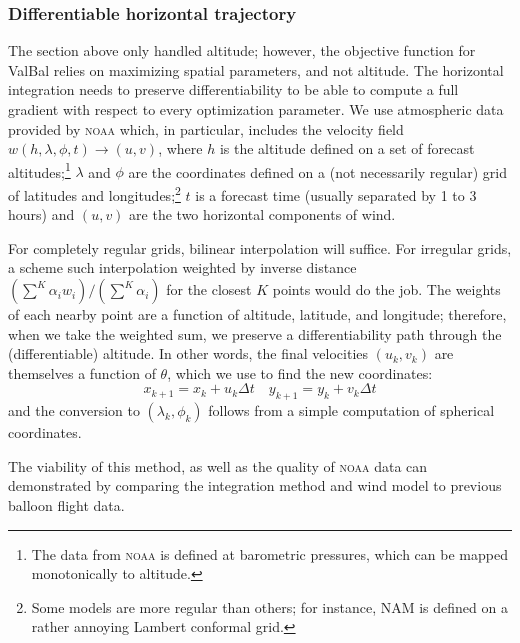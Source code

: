 \documentclass[11pt]{scrartcl} %
\begin{document}
\subsubsection{Differentiable horizontal trajectory} \label{sec:horizontal}
The section above only handled altitude; however, the objective function for ValBal relies on maximizing spatial parameters, and not altitude. The horizontal integration needs to preserve differentiability to be able to compute a full gradient with respect to every optimization parameter. We use atmospheric data provided by \textsc{noaa} which, in particular, includes the velocity field $w(h, \lambda, \phi, t)\to(u, v)$, where $h$ is the altitude defined on a set of forecast altitudes;\footnote{The data from \textsc{noaa} is defined at barometric pressures, which can be mapped monotonically to altitude.} $\lambda$ and $\phi$ are the coordinates defined on a (not necessarily regular) grid of latitudes and longitudes;\footnote{Some models are more regular than others; for instance, NAM is defined on a rather annoying Lambert conformal grid.} $t$ is a forecast time (usually separated by 1 to 3 hours) and $(u, v)$ are the two horizontal components of wind.

For completely regular grids, bilinear interpolation will suffice. For irregular grids, a scheme such interpolation weighted by inverse distance $(\sum^K \alpha_i w_i)/(\sum^K \alpha_i)$ for the closest $K$ points would do the job. The weights of each nearby point are a function of altitude, latitude, and longitude; therefore, when we take the weighted sum, we preserve a differentiability path through the (differentiable) altitude. In other words, the final velocities $(u_k, v_k)$ are themselves a function of $\theta$, which we use to find the new coordinates:
\[x_{k+1} = x_k + u_k\Delta t\quad y_{k+1} = y_k + v_k\Delta t\]
and the conversion to $(\lambda_k, \phi_k)$ follows from a simple computation of spherical coordinates. 

The viability of this method, as well as the quality of \textsc{noaa} data can demonstrated by comparing the integration method and wind model to previous balloon flight data.

\end{document}
